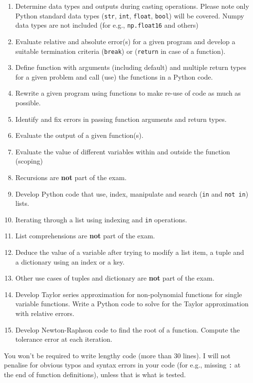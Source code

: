 \documentclass[]{article}
\begin{document}
\begin{enumerate}
	\item Determine data types and outputs during casting operations. Please note only Python standard data types (\verb|str|, \verb|int|, \verb|float|, \verb|bool|) will be covered. Numpy data types are not included (for e.g., \verb|np.float16| and others)
	\item Evaluate relative and absolute error(s) for a given program and develop  a suitable termination criteria (\verb|break|) or (\verb|return| in case of a function).
	\item Define function with arguments (including default) and multiple return types for a given problem and call (use) the functions in a Python code.
	\item Rewrite a given program using functions to make re-use of code as much as possible.
\item Identify and fix errors in passing function arguments and return types.
	\item Evaluate the output of a given function(s).
	\item Evaluate the value of different variables within and outside the function (scoping)
	\item Recursions are \textbf{not} part of the exam.
	\item Develop Python code that use, index, manipulate and search (\verb|in| and \verb|not in|) lists.
	\item Iterating through a list using indexing and \verb|in| operations.
	\item List comprehensions are \textbf{not} part of the exam.
	\item Deduce the value of a variable after trying to modify a list item, a tuple and a dictionary using an index or a key.
	\item Other use cases of tuples and dictionary are \textbf{not} part of the exam.
	\item Develop Taylor series approximation for non-polynomial functions for single variable functions. Write a Python code to solve for the Taylor approximation with relative errors.
	\item Develop Newton-Raphson code to find the root of a function. Compute the tolerance error at each iteration.


\end{enumerate}

You won't be required to write lengthy code (more than 30 lines). I will not penalise for obvious typos and syntax errors in your code (for e.g., missing \verb|:| at the end of function definitions), unless that is what is tested.
\end{document}
